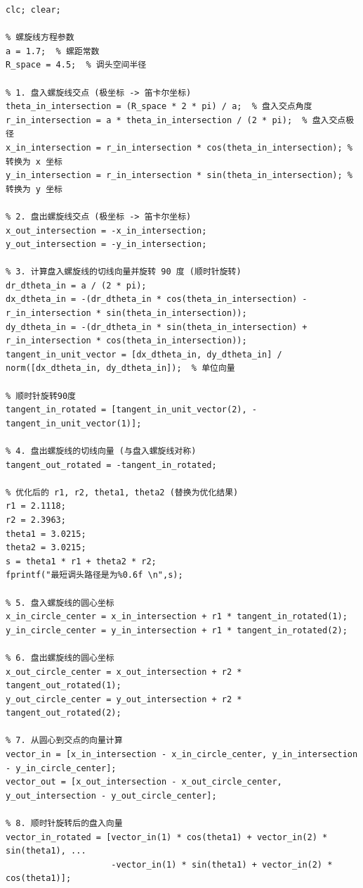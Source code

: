 \documentclass{cumcmthesis1}
\begin{document}
\begin{lstlisting}[caption={对问题4中求得的最短调头曲线进行验证的代码}, label={lst:sixth_code}]
clc; clear;

% 螺旋线方程参数
a = 1.7;  % 螺距常数
R_space = 4.5;  % 调头空间半径

% 1. 盘入螺旋线交点 (极坐标 -> 笛卡尔坐标)
theta_in_intersection = (R_space * 2 * pi) / a;  % 盘入交点角度
r_in_intersection = a * theta_in_intersection / (2 * pi);  % 盘入交点极径
x_in_intersection = r_in_intersection * cos(theta_in_intersection); % 转换为 x 坐标
y_in_intersection = r_in_intersection * sin(theta_in_intersection); % 转换为 y 坐标

% 2. 盘出螺旋线交点 (极坐标 -> 笛卡尔坐标)
x_out_intersection = -x_in_intersection;
y_out_intersection = -y_in_intersection;

% 3. 计算盘入螺旋线的切线向量并旋转 90 度 (顺时针旋转)
dr_dtheta_in = a / (2 * pi);
dx_dtheta_in = -(dr_dtheta_in * cos(theta_in_intersection) - r_in_intersection * sin(theta_in_intersection));
dy_dtheta_in = -(dr_dtheta_in * sin(theta_in_intersection) + r_in_intersection * cos(theta_in_intersection));
tangent_in_unit_vector = [dx_dtheta_in, dy_dtheta_in] / norm([dx_dtheta_in, dy_dtheta_in]);  % 单位向量

% 顺时针旋转90度
tangent_in_rotated = [tangent_in_unit_vector(2), -tangent_in_unit_vector(1)];

% 4. 盘出螺旋线的切线向量 (与盘入螺旋线对称)
tangent_out_rotated = -tangent_in_rotated;

% 优化后的 r1, r2, theta1, theta2 (替换为优化结果)
r1 = 2.1118;
r2 = 2.3963;
theta1 = 3.0215;
theta2 = 3.0215;
s = theta1 * r1 + theta2 * r2;
fprintf("最短调头路径是为%0.6f \n",s);

% 5. 盘入螺旋线的圆心坐标
x_in_circle_center = x_in_intersection + r1 * tangent_in_rotated(1);
y_in_circle_center = y_in_intersection + r1 * tangent_in_rotated(2);

% 6. 盘出螺旋线的圆心坐标
x_out_circle_center = x_out_intersection + r2 * tangent_out_rotated(1);
y_out_circle_center = y_out_intersection + r2 * tangent_out_rotated(2);

% 7. 从圆心到交点的向量计算
vector_in = [x_in_intersection - x_in_circle_center, y_in_intersection - y_in_circle_center];
vector_out = [x_out_intersection - x_out_circle_center, y_out_intersection - y_out_circle_center];

% 8. 顺时针旋转后的盘入向量
vector_in_rotated = [vector_in(1) * cos(theta1) + vector_in(2) * sin(theta1), ...
                     -vector_in(1) * sin(theta1) + vector_in(2) * cos(theta1)];


\end{lstlisting}
\end{document}

